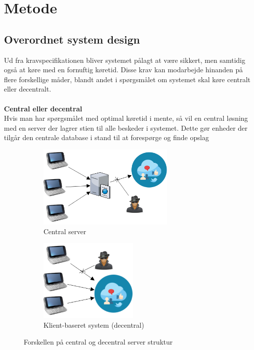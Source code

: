 \section{Metode}
\subsection{Overordnet system design}
Ud fra kravspecifikationen bliver systemet pålagt at være sikkert, men samtidig også at køre med en fornuftig køretid. Disse krav kan  modarbejde hinanden på flere forskellige måder, blandt andet i spørgsmålet om systemet skal køre centralt eller decentralt.
\\\\
\textbf{Central eller decentral}\\
Hvis man har spørgsmålet med optimal køretid i mente, så vil en central løsning med en server der lagrer stien til alle beskeder i systemet. Dette gør enheder der tilgår den centrale database i stand til at forespørge og finde opslag 


\begin{figure}[H]
    \begin{subfigure}{0.5\textwidth}
        \centering
        \includegraphics[width=1\linewidth, height=4cm]{Projectdoc/Assets/Illustrationer/Security_diagram_1.png} 
        \caption{Central server}
        \label{fig:central_server}
    \end{subfigure}
    \begin{subfigure}{0.5\textwidth}
        \centering
        \includegraphics[width=0.7\linewidth, height=4cm]{Projectdoc/Assets/Illustrationer/Security_diagram_2.png}
        \caption{Klient-baseret system (decentral)}
        \label{fig:decentral_server}
    \end{subfigure}
    \caption{Forskellen på central og decentral server struktur}
    \label{fig:serverstruktur}
\end{figure}

